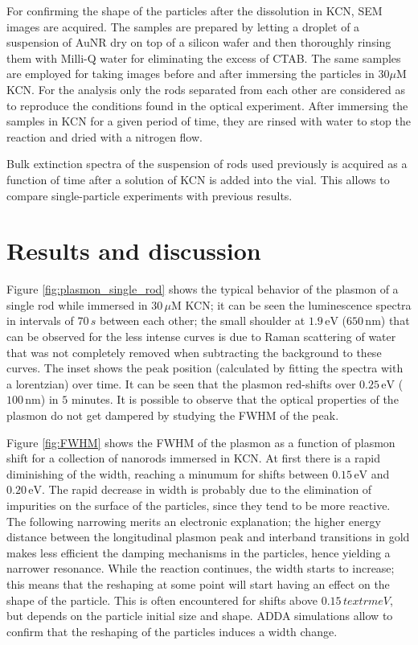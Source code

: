 \documentclass[twocolumn]{article}
\begin{document}
For confirming the shape of the particles after the dissolution in KCN, SEM
images are acquired. The samples are prepared by letting a droplet of a
suspension of AuNR dry on top of a silicon wafer and then thoroughly rinsing
them with Milli-Q water for eliminating the excess of CTAB. The same samples are
employed for taking images before and after immersing the particles in
$30\mu\textrm{M}$ KCN. For the analysis only the rods separated from each other
are considered as to reproduce the conditions found in the optical experiment.
After immersing the samples in KCN for a given period of time, they are rinsed
with water to stop the reaction and dried with a nitrogen flow.

Bulk extinction spectra of the suspension of rods used previously is acquired as
a function of time after a solution of KCN is added into the vial. This allows
to compare single-particle experiments with previous results. 

\section{Results and discussion}

Figure \ref{fig:plasmon_single_rod} shows the typical behavior of the plasmon of
a single rod while immersed in $30\,\mu\textrm{M}$ KCN; it can be seen the
luminescence spectra in intervals of $70\,s$ between each other; the small
shoulder at $1.9\,\textrm{eV}$ ($650\,\textrm{nm}$) that can be observed for the
less intense curves is due to Raman scattering of water that was not completely
removed when subtracting the background to these curves. The inset shows the
peak position (calculated by fitting the spectra with a lorentzian) over time.
It can be seen that the plasmon red-shifts over $0.25\,\textrm{eV}$
($100\,\textrm{nm}$) in $5$ minutes. It is possible to observe that the optical
properties of the plasmon do not get dampered by studying the FWHM of the peak.

Figure \ref{fig:FWHM} shows the FWHM of the plasmon as a function of plasmon
shift for a collection of nanorods immersed in KCN. At first there is a
rapid diminishing of the width, reaching a minumum for shifts between
$0.15\,\textrm{eV}$ and $0.20\,\textrm{eV}$. The rapid decrease in width is
probably due to the elimination of impurities on the surface of the
particles, since they tend to be more reactive. The following narrowing merits
an electronic explanation; the higher energy distance between the longitudinal
plasmon peak and interband transitions in gold makes less efficient the damping
mechanisms in the particles, hence yielding a narrower resonance. While the
reaction continues, the width starts to increase; this means that the reshaping
at some point will start having an effect on the shape of the particle. This is
often encountered for shifts above $0.15\,textrm{eV}$, but depends on the
particle initial size and shape. ADDA simulations allow to confirm that
the reshaping of the particles induces a width change. 
\end{document}
